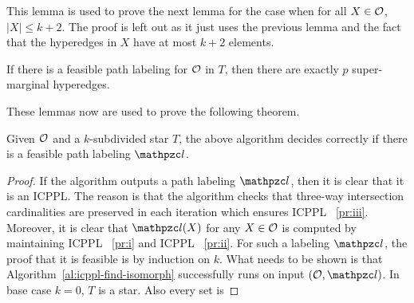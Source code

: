 This lemma is used to prove the next lemma for the case when for all
$X \in {\cal O}$, $|X| \leq k+2$.  The proof is left out as it just uses
the previous lemma and the fact that the hyperedges in $X$ have at
most $k+2$ elements.
\begin{lemma}
  If there is a feasible path labeling for ${\cal O}$ in $T$, then there
  are exactly $p$ super-marginal hyperedges.
\end{lemma}
These lemmas now are used to prove the following theorem.
\begin{theorem}
  Given ${\cal O}$ and a $k$-subdivided star $T$, the above algorithm
  decides correctly if there is a feasible path labeling $\cl$.
\end{theorem}
\begin{proof}
  If the algorithm outputs a path labeling $\cl$, then it is clear
  that it is an ICPPL. The reason is that the algorithm checks that
  three-way intersection cardinalities are preserved in each iteration
  which ensures ICPPL \icpplpr~\ref{pr:iii}. Moreover, it is clear
  that $\cl(X)$ for any $X \in {\cal O}$ is computed by maintaining ICPPL
  \icpplpr~\ref{pr:i} and ICPPL \icpplpr~\ref{pr:ii}. For such a
  labeling $\cl$, the proof that it is feasible is by induction on
  $k$. What needs to be shown is that
  Algorithm~\ref{al:icppl-find-isomorph} successfully runs on input
  $(\cO, \cl)$. In base case $k=0$, $T$ is a star. Also every set is

\end{proof}
